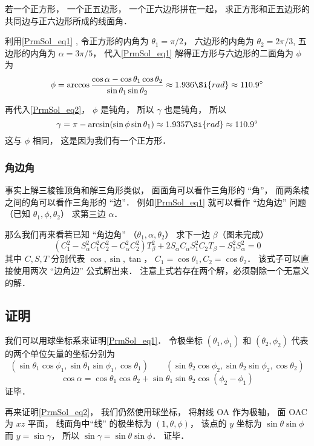 \begin{example}{}
若一个正方形， 一个正五边形， 一个正六边形拼在一起， 求正方形和正五边形的共同边与正六边形所成的线面角．

利用\autoref{PrmSol_eq1} , 令正方形的内角为 $\theta_1 = \pi/2$， 六边形的内角为 $\theta_2 = 2\pi/3$, 五边形的内角为 $\alpha = 3\pi/5$， 代入\autoref{PrmSol_eq1} 解得正方形与六边形的二面角为 $\phi$ 为
\begin{equation}
\phi = \arccos\frac{\cos\alpha - \cos\theta_1 \cos\theta_2}{\sin\theta_1\sin\theta_2} \approx 1.936\Si{rad} \approx 110.9^\circ
\end{equation}

再代入\autoref{PrmSol_eq2}， $\phi$ 是钝角， 所以 $\gamma$ 也是钝角， 所以
\begin{equation}
\gamma = \pi - \arcsin(\sin\phi \sin\theta_1) \approx 1.9357 \Si{rad} \approx 110.9^\circ
\end{equation}
这与 $\phi$ 相同， 这是因为我们有一个正方形．
\end{example}

\subsubsection{角边角}
事实上解三棱锥顶角和解三角形类似， 面面角可以看作三角形的 “角”， 而两条棱之间的角可以看作三角形的 “边”． 例如\autoref{PrmSol_eq1} 就可以看作 “边角边” 问题 （已知 $\theta_1, \phi, \theta_2$） 求第三边 $\alpha$．

那么我们再来看若已知 “角边角” （$\theta_1, \alpha, \theta_2$） 求下一边 $\beta$（图未完成）
\begin{equation}
(C_1^2 - S_\alpha^2 C_1^2 C_2^2 - C_\alpha^2 C_2^2)T_\beta^2 + 2S_\alpha C_\alpha S_1^2 C_2 T_\beta - S_1^2 S_\alpha^2 = 0
\end{equation}
其中 $C,S,T$ 分别代表 $\cos, \sin, \tan$， $C_1 = \cos\theta_1, C_2 = \cos\theta_2$． 该式子可以直接使用两次 “边角边” 公式解出来． 注意上式若存在两个解，必须剔除一个无意义的解．

\subsection{证明}
我们可以用球坐标系来证明\autoref{PrmSol_eq1}． 令极坐标 $(\theta_1, \phi_1)$ 和 $(\theta_2, \phi_2)$ 代表的两个单位矢量的坐标分别为
\begin{equation}
(\sin\theta_1\cos\phi_1, \sin\theta_1\sin\phi_1, \cos\theta_1)
\qquad
(\sin\theta_2\cos\phi_2, \sin\theta_2\sin\phi_2, \cos\theta_2)
\end{equation}
\begin{equation}
\cos\alpha = \cos\theta_1 \cos\theta_2 + \sin\theta_1 \sin\theta_2 \cos(\phi_2 - \phi_1)
\end{equation}
证毕．

再来证明\autoref{PrmSol_eq2}， 我们仍然使用球坐标， 将射线 OA 作为极轴， 面 OAC 为 $xz$ 平面， 线面角中“线” 的极坐标为 $(1, \theta, \phi)$， 该点的 $y$ 坐标为 $\sin\theta \sin\phi$ 而 $y = \sin\gamma$， 所以 $\sin\gamma = \sin\theta \sin\phi$． 证毕．